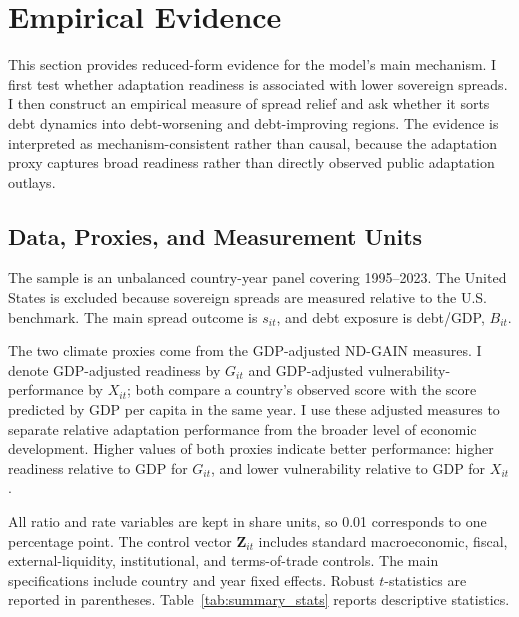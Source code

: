 \section{Empirical Evidence}
\label{sec:empirical}

This section provides reduced-form evidence for the model's main mechanism. I first test whether adaptation readiness is associated with lower sovereign spreads. I then construct an empirical measure of spread relief and ask whether it sorts debt dynamics into debt-worsening and debt-improving regions. The evidence is interpreted as mechanism-consistent rather than causal, because the adaptation proxy captures broad readiness rather than directly observed public adaptation outlays.

\subsection{Data, Proxies, and Measurement Units}

The sample is an unbalanced country-year panel covering 1995--2023. The United States is excluded because sovereign spreads are measured relative to the U.S. benchmark. The main spread outcome is $s_{it}$, and debt exposure is debt/GDP, $B_{it}$.

The two climate proxies come from the GDP-adjusted ND-GAIN measures. I denote GDP-adjusted readiness by $G_{it}$ and GDP-adjusted vulnerability-performance by $X_{it}$; both compare a country's observed score with the score predicted by GDP per capita in the same year. I use these adjusted measures to separate relative adaptation performance from the broader level of economic development. Higher values of both proxies indicate better performance: higher readiness relative to GDP for $G_{it}$, and lower vulnerability relative to GDP for $X_{it}$.

All ratio and rate variables are kept in share units, so 0.01 corresponds to one percentage point. The control vector $\mathbf{Z}_{it}$ includes standard macroeconomic, fiscal, external-liquidity, institutional, and terms-of-trade controls. The main specifications include country and year fixed effects. Robust $t$-statistics are reported in parentheses. Table~\ref{tab:summary_stats} reports descriptive statistics.

